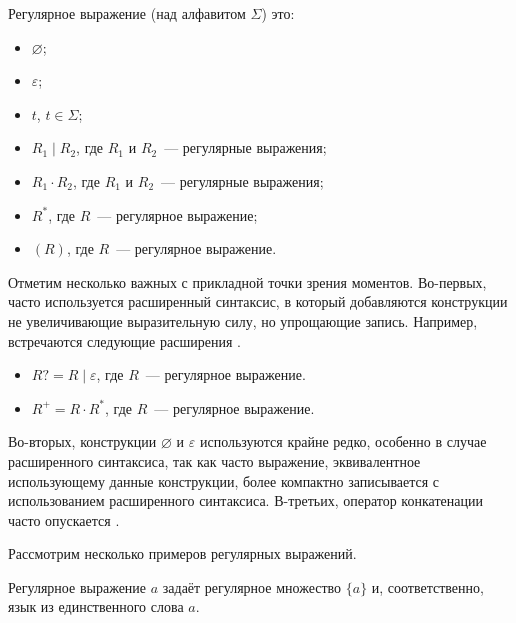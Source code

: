 \begin{definition}
    Регулярное выражение (над алфавитом $\Sigma$) это:
    \begin{itemize}
        \item $\varnothing$;
        \item $\varepsilon$;
        \item $t$, $t \in \Sigma$;
        \item $R_1 \mid R_2$, где $R_1$ и $R_2$~--- регулярные выражения;
        \item $R_1 \cdot R_2$, где $R_1$ и $R_2$~--- регулярные выражения;
        \item $R^*$, где $R$~--- регулярное выражение;
        \item $(R)$, где $R$~--- регулярное выражение.
    \end{itemize}
\end{definition}

Отметим несколько важных с прикладной точки зрения моментов.
Во-первых, часто используется расширенный синтаксис, в который добавляются конструкции не увеличивающие выразительную силу, но упрощающие запись.
Например, встречаются следующие расширения%
.
\begin{itemize}
    \item $R? = R \mid \varepsilon$, где $R$~--- регулярное выражение.
    \item $R^+ = R \cdot R^*$, где $R$~--- регулярное выражение.
\end{itemize}

Во-вторых, конструкции $\varnothing$ и $\varepsilon$ используются крайне редко, особенно в случае расширенного синтаксиса, так как часто выражение, эквивалентное использующему данные конструкции, более компактно записывается с использованием расширенного синтаксиса.
В-третьих, оператор конкатенации часто опускается%
.

Рассмотрим несколько примеров регулярных выражений.
\begin{example}
    Регулярное выражение $a$ задаёт регулярное множество $\{a\}$ и, соответственно, язык из единственного слова $a$.
\end{example}


